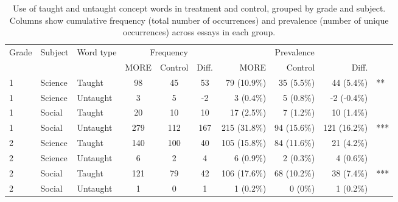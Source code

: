 \begin{table}[ht]
\centering
\caption{Use of taught and untaught concept words in treatment and control,
                    grouped by grade and subject. Columns show cumulative frequency (total number of occurrences) and prevalence
                    (number of unique occurrences) across essays in each group.} 
\label{tab:cwords}
\begin{tabular}{lllcccrrrl}
  \hline
 \multirow{2}{*}{Grade} & \multirow{2}{*}{Subject} & \multirow{2}{*}{Word type} & \multicolumn{3}{c}{Frequency}
                      & \multicolumn{3}{c}{Prevalence}\\ \cline{4-6}\cline{7-9}
 &  &  & MORE & Control & Diff. & MORE & Control & Diff. &  \\ 
  \hline
1 & Science & Taught &  98 &  45 &  53 & 79 (10.9\%) & 35 (5.5\%) & 44 (5.4\%) & ** \\ 
  1 & Science & Untaught &   3 &   5 &  -2 & 3 (0.4\%) & 5 (0.8\%) & -2 (-0.4\%) &  \\ 
  1 & Social & Taught &  20 &  10 &  10 & 17 (2.5\%) & 7 (1.2\%) & 10 (1.4\%) &  \\ 
  1 & Social & Untaught & 279 & 112 & 167 & 215 (31.8\%) & 94 (15.6\%) & 121 (16.2\%) & *** \\ 
  2 & Science & Taught & 140 & 100 &  40 & 105 (15.8\%) & 84 (11.6\%) & 21 (4.2\%) &  \\ 
  2 & Science & Untaught &   6 &   2 &   4 & 6 (0.9\%) & 2 (0.3\%) & 4 (0.6\%) &  \\ 
  2 & Social & Taught & 121 &  79 &  42 & 106 (17.6\%) & 68 (10.2\%) & 38 (7.4\%) & *** \\ 
  2 & Social & Untaught &   1 &   0 &   1 & 1 (0.2\%) & 0 (0\%) & 1 (0.2\%) &  \\ 
   \hline
\end{tabular}
\end{table}

